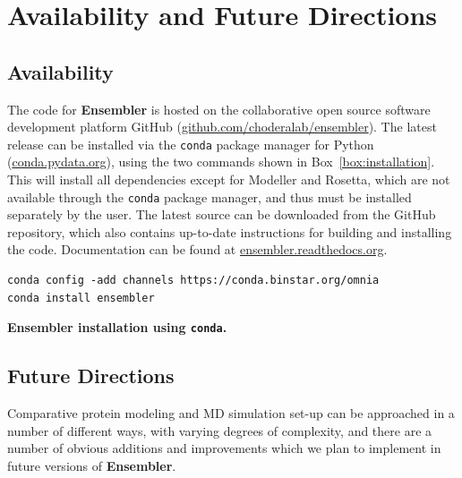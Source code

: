 \documentclass[aps,pre,twocolumn,nofootinbib,superscriptaddress,linenumbers]{revtex4-1}
\begin{document}
\section{Availability and Future Directions}
\label{section:availability}

\subsection*{Availability}

The code for {\bf Ensembler} is hosted on the collaborative open source software development platform GitHub (\href{http://github.com/choderalab/ensembler}{github.com/choderalab/ensembler}).
The latest release can be installed via the {\tt conda} package manager for Python (\href{http://conda.pydata.org}{conda.pydata.org}), using the two commands shown in Box~\ref{box:installation}.
This will install all dependencies except for Modeller and Rosetta, which are not available through the {\tt conda} package manager, and thus must be installed separately by the user.
The latest source can be downloaded from the GitHub repository, which also contains up-to-date instructions for building and installing the code.
Documentation can be found at \href{http://ensembler.readthedocs.org/en/latest/}{ensembler.readthedocs.org}.

\begin{codebox}[tbp]
\scriptsize
\begin{Verbatim}[frame=single]
conda config -add channels https://conda.binstar.org/omnia
conda install ensembler
\end{Verbatim}
\caption{{\bf Ensembler installation using {\tt conda}.}
}
\label{box:installation}
\end{codebox}

\subsection*{Future Directions}

Comparative protein modeling and MD simulation set-up can be approached in a number of different ways, with varying degrees of complexity, and there are a number of obvious additions and improvements which we plan to implement in future versions of {\bf Ensembler}.
\end{document}
